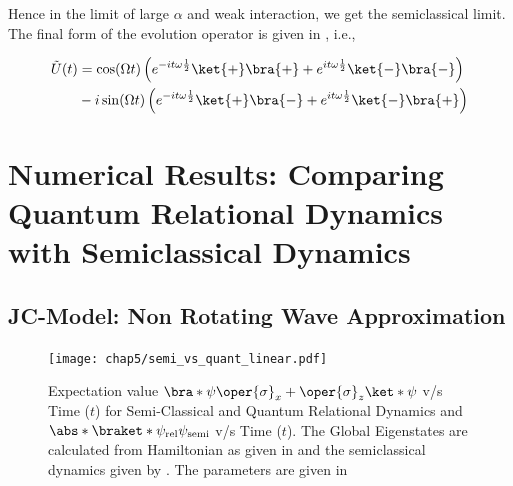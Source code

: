 Hence in the limit of large \(\alpha\) and weak interaction, we get the 
semiclassical limit. The final form of the evolution operator is given in , i.e., 

\begin{mdframed}
    \begin{align}
    \label{eq:appen_JCM_V_g_limit2}
    \tilde{U}(t) 
    &= \cos(\Omega t) \left(e^{-i t \omega \frac{1}{2}}\ket{+}\bra{+} + 
    e^{i t \omega \frac{1}{2}}\ket{-}\bra{-} \right)  \nonumber \\
    &- i \sin(\Omega t)
     \left( e^{-i t \omega \frac{1}{2}}\ket{+}\bra{-}
    + e^{i t \omega \frac{1}{2}}\ket{-}\bra{+}\right) 
\end{align}
\end{mdframed}

\section{Numerical Results: Comparing Quantum Relational Dynamics with Semiclassical Dynamics
\label{sec:chap5_numerical_results}}

\subsection*{JC-Model: Non Rotating Wave Approximation} 
\begin{figure}[!h]
    \centering
    \texttt{[image: chap5/semi\_vs\_quant\_linear.pdf]}
    \caption{Expectation value
        \(\bra*{\psi} \oper{\sigma}_x + \oper{\sigma}_z \ket*{\psi}\) v/s Time ($t$) for Semi-Classical and Quantum Relational Dynamics
    and \(\abs*{\braket*{\psi_{\mathrm{rel}}}{\psi_{\mathrm{semi}}}}\) v/s Time ($t$). The Global Eigenstates are calculated from 
    Hamiltonian as given in  and the semiclassical dynamics given by . The parameters 
    are given in 
    }
     \label{fig:chap5_linear_semi_vs_quant}
\end{figure}



